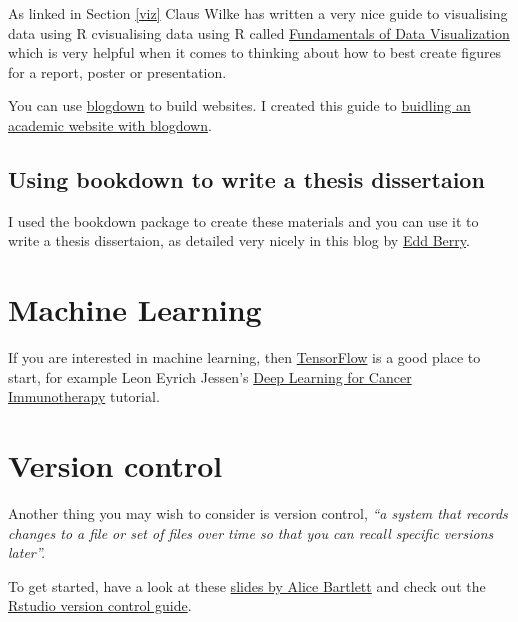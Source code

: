\documentclass[12pt,]{book}
\begin{document}
As linked in Section \ref{viz} Claus Wilke has written a very nice guide to
visualising data using R cvisualising data using R called
\href{http://serialmentor.com/dataviz/index.html}{Fundamentals of Data Visualization}
which is very helpful when it comes to thinking about how to best create figures
for a report, poster or presentation.

You can use \href{https://bookdown.org/yihui/blogdown/}{blogdown} to build websites.
I created this guide to \href{http://ab604.github.io/docs/website_bookdown/}{buidling an academic website with blogdown}.

\hypertarget{using-bookdown-to-write-a-thesis-dissertaion}{%
\subsection{Using bookdown to write a thesis dissertaion}\label{using-bookdown-to-write-a-thesis-dissertaion}}

I used the bookdown package to create these materials \citep{R-bookdown} and you can
use it to write a thesis dissertaion, as detailed very nicely in this blog by
\href{https://eddjberry.netlify.com/post/writing-your-thesis-with-bookdown/}{Edd Berry}.

\hypertarget{machine-learning}{%
\section{Machine Learning}\label{machine-learning}}

If you are interested in machine learning, then \href{https://tensorflow.rstudio.com/}{TensorFlow} is a good place to start, for
example Leon Eyrich Jessen's \href{https://tensorflow.rstudio.com/blog/dl-for-cancer-immunotherapy.html}{Deep Learning for Cancer Immunotherapy} tutorial.

\hypertarget{version-control}{%
\section{Version control}\label{version-control}}

Another thing you may wish to consider is version control, \emph{``a system that records changes to a file or set of files over time so that you can recall specific versions later''.}

To get started, have a look at these \href{https://speakerdeck.com/alicebartlett/git-for-humans}{slides by Alice Bartlett} and check out the \href{https://support.rstudio.com/hc/en-us/articles/200532077-Version-Control-with-Git-and-SVN}{Rstudio version control guide}.


\end{document}

